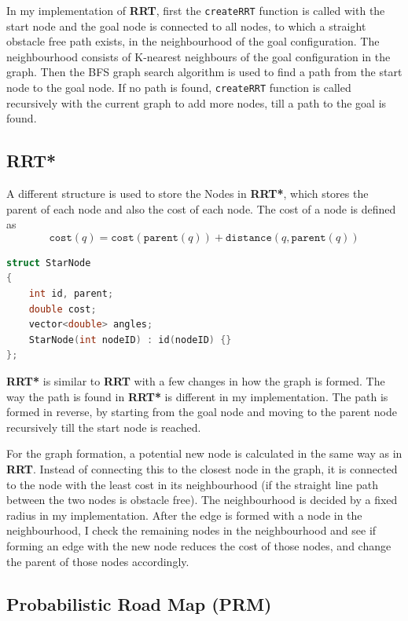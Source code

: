 \documentclass[11pt]{article}
\begin{document}
In my implementation of \textbf{RRT}, first the \texttt{createRRT} function is called with the start node 
and the goal node is connected to all nodes, to which a straight obstacle free path exists, in the neighbourhood of the goal configuration. The
neighbourhood consists of K-nearest neighbours of the goal configuration in the graph. Then the BFS
graph search algorithm is used to find a path from the start node to the goal node. If no path is found, \texttt{createRRT} function is called recursively with the current 
graph to add more nodes, till a path to the goal is found.

\subsection{RRT*}
A different structure is used to store the Nodes in \textbf{RRT*}, which stores the parent
of each node and also the cost of each node. The cost of a node is defined as 
$$\texttt{cost}(q) = \texttt{cost}(\texttt{parent}(q)) + \texttt{distance}(q, \texttt{parent}(q))$$
\begin{lstlisting}[language=c++]
struct StarNode
{
    int id, parent;
    double cost;
    vector<double> angles;
    StarNode(int nodeID) : id(nodeID) {}
};
\end{lstlisting}
\textbf{RRT*} is similar to \textbf{RRT} with a few changes in how the graph is formed. 
The way the path is found in \textbf{RRT*} is different in my implementation. The path is formed in reverse, 
by starting from the goal node and moving to the parent node recursively till the start node is reached.

For the graph formation, a potential new node is calculated in the same way as in \textbf{RRT}. Instead 
of connecting this to the closest node in the graph, it is connected to the node with the least cost in its neighbourhood (if the straight line path between the two nodes is obstacle free).
The neighbourhood is decided by a fixed radius in my implementation. After the edge is formed with a node in the neighbourhood, I check the remaining nodes in the neighbourhood
and see if forming an edge with the new node reduces the cost of those nodes, and change the parent of those nodes accordingly. 

\subsection{Probabilistic Road Map (PRM)}
\end{document}
